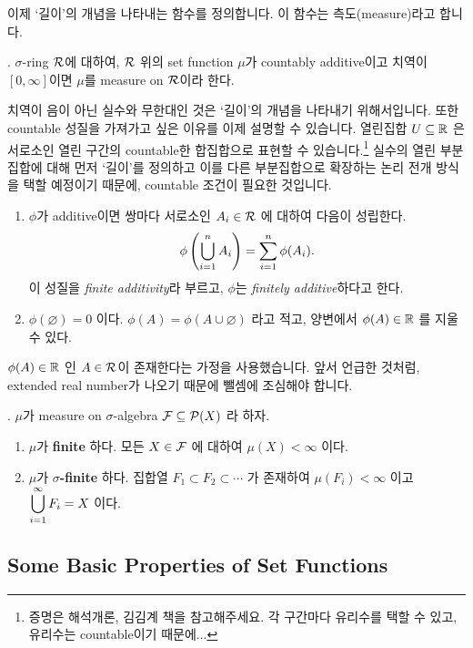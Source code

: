 이제 `길이'의 개념을 나타내는 함수를 정의합니다. 이 함수는 측도(measure)라고 합니다.

.  \(\sigma\)-ring \(\mathcal{R}\)에 대하여, \(\mathcal{R}\) 위의 set function \(\mu\)가 countably additive이고 치역이 \([0, \infty]\)이면 \(\mu\)를 measure on \(\mathcal{R}\)이라 한다.

치역이 음이 아닌 실수와 무한대인 것은 `길이'의 개념을 나타내기 위해서입니다. 또한 countable 성질을 가져가고 싶은 이유를 이제 설명할 수 있습니다. 열린집합 \(U \subseteq \mathbb{R}\) 은 서로소인 열린 구간의 countable한 합집합으로 표현할 수 있습니다.\footnote{증명은 해석개론, 김김계 책을 참고해주세요. 각 구간마다 유리수를 택할 수 있고, 유리수는 countable이기 때문에...} 실수의 열린 부분집합에 대해 먼저 `길이'를 정의하고 이를 다른 부분집합으로 확장하는 논리 전개 방식을 택할 예정이기 때문에, countable 조건이 필요한 것입니다.

\medskip

\rmk
\begin{enumerate}
    \item \(\phi\)가 additive이면 쌍마다 서로소인 \(A_i \in \mathcal{R}\) 에 대하여 다음이 성립한다.
          \[
              \phi\left( \bigcup_{i=1}^n A_i \right) = \sum_{i=1}^n \phi(A_i).
          \]
          이 성질을 \textit{finite additivity}라 부르고, \(\phi\)는 \textit{finitely additive}하다고 한다.

    \item \(\phi(\varnothing) = 0\) 이다. \(\phi(A) = \phi(A \cup \varnothing)\) 라고 적고, 양변에서 \(\phi(A) \in \mathbb{R}\) 를 지울 수 있다.
\end{enumerate}

\(\phi(A) \in \mathbb{R}\) 인 \(A \in \mathcal{R}\)이 존재한다는 가정을 사용했습니다. 앞서 언급한 것처럼, extended real number가 나오기 때문에 뺄셈에 조심해야 합니다.

\medskip

. \(\mu\)가 measure on \(\sigma\)-algebra \(\mathcal{F} \subseteq \mathcal{P}(X)\) 라 하자.
\begin{enumerate}
    \item \(\mu\)가 \textbf{finite} 하다. \miff 모든 \(X \in \mathcal{F}\) 에 대하여 \(\mu(X) < \infty\) 이다.
    \item \(\mu\)가 \textbf{\(\sigma\)-finite} 하다. \miff 집합열 \(F_1 \subset F_2 \subset \cdots\) 가 존재하여 \(\mu(F_i) < \infty \) 이고 \(\displaystyle \bigcup_{i=1}^\infty F_i = X\) 이다.
\end{enumerate}

\subsection*{Some Basic Properties of Set Functions}

